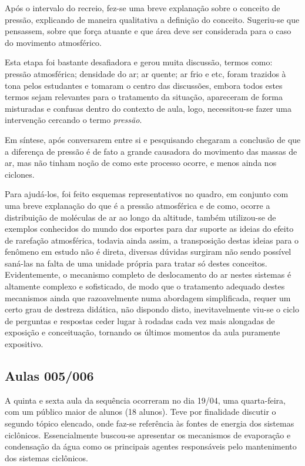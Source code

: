 Após o intervalo do recreio, fez-se uma breve explanação sobre o conceito de pressão, explicando de maneira qualitativa a definição do conceito. Sugeriu-se que pensassem, sobre que força atuante e que área deve ser considerada para o caso do movimento atmosférico.

Esta etapa foi bastante desafiadora e gerou muita discussão, termos como: pressão atmosférica; densidade do ar; ar quente; ar frio e etc, foram trazidos à tona pelos estudantes e tomaram o centro das discussões, embora todos estes termos sejam relevantes para o tratamento da situação, apareceram de forma misturadas e confusas dentro do contexto de aula, logo, necessitou-se fazer uma intervenção cercando o termo \textit{pressão}.

Em síntese, após conversarem entre si e pesquisando chegaram a conclusão de que a diferença de pressão é de fato a grande causadora do movimento das massas de ar, mas não tinham noção de como este processo ocorre, e menos ainda nos ciclones.

Para ajudá-los, foi feito esquemas representativos no quadro, em conjunto com uma breve explanação do que é a pressão atmosférica e de como, ocorre a distribuição de moléculas de ar ao longo da altitude, também utilizou-se de exemplos conhecidos do mundo dos esportes para dar suporte as ideias do efeito de rarefação atmosférica, todavia ainda assim, a transposição destas ideias para o fenômeno em estudo não é direta, diversas dúvidas surgiram não sendo possível saná-las na falta de uma unidade própria para tratar só destes conceitos. Evidentemente, o mecanismo completo de deslocamento do ar nestes sistemas é altamente complexo e sofisticado, de modo que o tratamento adequado destes mecanismos ainda que razoavelmente numa abordagem simplificada, requer um certo grau de destreza didática, não dispondo disto, inevitavelmente viu-se o ciclo de perguntas e respostas ceder lugar à rodadas cada vez mais alongadas de exposição e conceituação, tornando os últimos momentos da aula puramente expositivo.

\subsection{Aulas 005/006} %
\label{sub:Aulas 005/006}
A quinta e sexta aula da sequência ocorreram no dia 19/04, uma quarta-feira, com um público maior de alunos (18 alunos). Teve por finalidade discutir o segundo tópico elencado, onde faz-se referência às fontes de energia dos sistemas ciclônicos. Essencialmente buscou-se apresentar os mecanismos de evaporação e condensação da água como os principais agentes responsáveis pelo mantenimento dos sistemas ciclônicos.


